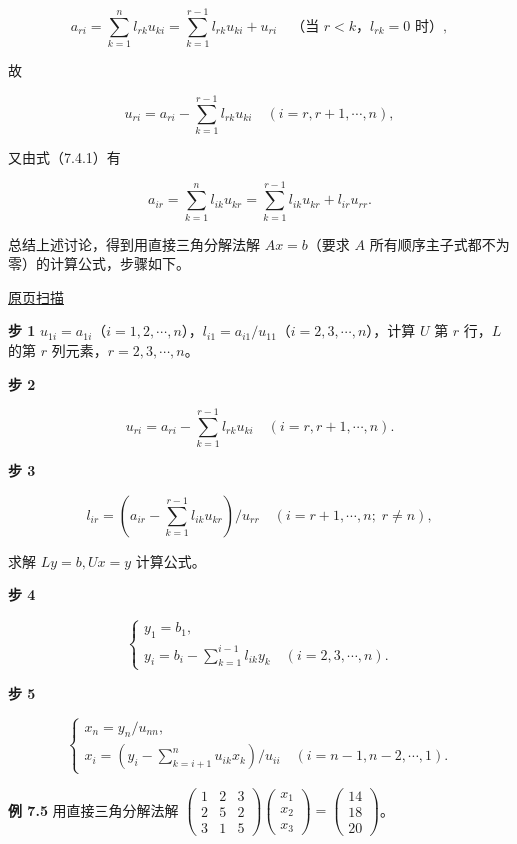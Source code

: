 \documentclass[
  10pt,
  fontset=fandol]{ctexart}
\begin{document}
\[a_{ri}=\sum_{k=1}^{n}l_{rk}u_{ki}=\sum_{k=1}^{r-1}l_{rk}u_{ki}+u_{ri}\quad\text{（当 $r<k$，$l_{rk}=0$ 时）},\]

故

\[u_{ri}=a_{ri}-\sum_{k=1}^{r-1}l_{rk}u_{ki}\quad(i=r,r+1,\cdots,n),\]

又由式（7.4.1）有

\[a_{ir}=\sum_{k=1}^{n}l_{ik}u_{kr}=\sum_{k=1}^{r-1}l_{ik}u_{kr}+l_{ir}u_{rr}.\]

总结上述讨论，得到用直接三角分解法解 \(Ax=b\)（要求 \(A\) 所有顺序主子式都不为零）的计算公式，步骤如下。

\href{../../source-images/pdf-192.jpeg}{原页扫描}

\textbf{步 1} \(u_{1i}=a_{1i}\)（\(i=1,2,\cdots,n\)），\(l_{i1}=a_{i1}/u_{11}\)（\(i=2,3,\cdots,n\)），计算 \(U\) 第 \(r\) 行，\(L\) 的第 \(r\) 列元素，\(r=2,3,\cdots,n\)。

\textbf{步 2}

\[u_{ri}=a_{ri}-\sum_{k=1}^{r-1}l_{rk}u_{ki}\quad(i=r,r+1,\cdots,n).\tag{7.4.2}\]

\textbf{步 3}

\[l_{ir}=\left(a_{ir}-\sum_{k=1}^{r-1}l_{ik}u_{kr}\right)/u_{rr}\quad(i=r+1,\cdots,n;\;r\ne n),\tag{7.4.3}\]

求解 \(Ly=b,Ux=y\) 计算公式。

\textbf{步 4}

\[
\begin{cases}
y_1=b_1,\\
y_i=\displaystyle b_i-\sum_{k=1}^{i-1}l_{ik}y_k\quad(i=2,3,\cdots,n).
\end{cases}
\tag{7.4.4}
\]

\textbf{步 5}

\[
\begin{cases}
x_n=y_n/u_{nn},\\
x_i=\displaystyle\left(y_i-\sum_{k=i+1}^{n}u_{ik}x_k\right)/u_{ii}\quad(i=n-1,n-2,\cdots,1).
\end{cases}
\tag{7.4.5}
\]

\textbf{例 7.5} 用直接三角分解法解 \(\begin{pmatrix}1&2&3\\2&5&2\\3&1&5\end{pmatrix}\begin{pmatrix}x_1\\x_2\\x_3\end{pmatrix}=\begin{pmatrix}14\\18\\20\end{pmatrix}\)。
\end{document}
